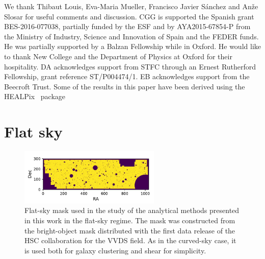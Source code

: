\documentclass[a4paper,11pt]{article}
\newcommand{\cgg}[1]{{\color{olive} #1}}
\begin{document}
  \acknowledgments
  We thank Thibaut Louis, Eva-Maria Mueller, Francisco Javier S\'anchez and
  An\v ze Slosar for useful comments and discussion. CGG is supported the
  Spanish grant BES-2016-077038, partially funded by the ESF and by
  AYA2015-67854-P from the Ministry of Industry, Science and Innovation of
  Spain and the FEDER funds. He was partially supported by a Balzan Fellowship
  while in Oxford. He would like to thank New College and the Department of
  Physics at Oxford for their hospitality. DA acknowledges support from STFC
  through an Ernest Rutherford Fellowship, grant reference ST/P004474/1. EB
  acknowledges support from the Beecroft Trust.  \cgg{Some of the results in this
  paper have been derived using the HEALPix~\cite{Gorski:2004by} package}
  
  \appendix
  \section{Flat sky}\label{app:flat}
    \begin{figure}
      \centering
      \includegraphics[width=0.6\textwidth]{./figures/mask-lss_flat1.pdf}
      \caption{Flat-sky mask used in the study of the analytical methods presented in this work in the flat-sky regime. The mask was constructed from the bright-object mask distributed with the first data release of the HSC collaboration \cite{2018PASJ...70S...4A} for the VVDS field. As in the curved-sky case, it is used both for galaxy clustering and shear for simplicity.} \label{fig:mask_flat}
    \end{figure}
\end{document}
